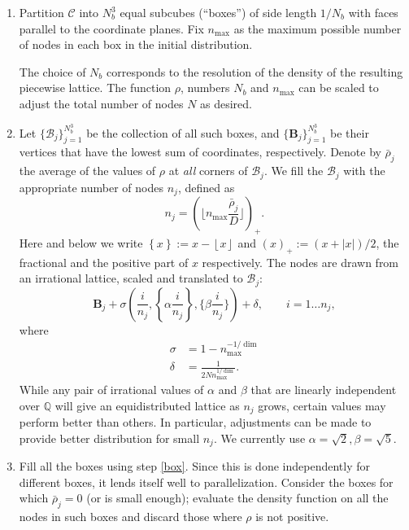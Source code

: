 \documentclass[10pt]{amsart}
\newcommand{\ndbox}{\mathcal{B}}
\begin{document}
\begin{enumerate}
	
	\item \label{subcubes}  Partition $\mathcal{C}$ into $N_b^3$ equal subcubes (``boxes'') of side length $1/N_b$ with faces parallel to the coordinate planes. Fix $n_\text{max}$ as the maximum possible number of nodes in each box in the initial distribution. 
	
	The choice of $N_b$ corresponds to the resolution of the density of the resulting piecewise lattice. The function $ \rho $, numbers $N_b$  and $n_\text{max}$ can be scaled to adjust the total number of nodes $N$ as desired. 
	
	\item \label{box}  Let  $\{\ndbox_j\}_{j=1}^{N_b^3}$ be the collection of all such boxes, and $\{\boldsymbol{B}_j\}_{j=1}^{N_b^3}$ be their vertices that have the lowest sum of coordinates, respectively. Denote by $\bar{\rho}_j$ the average of the values of $\rho$ at \textit{all} corners of $\ndbox_j$. We fill the $ \mathcal{B}_j $ with the appropriate number of nodes $ n_j $, defined as 
	\[  n_j = \left(\lfloor  n_\text{max} \frac{ \bar{\rho}_j}{D} \rfloor \right)_+.  \] 
	Here and below we write $\left\{x\right\}:= x-\left\lfloor x\right\rfloor$   and $ \left(x\right)_+:=(x+|x|)/2 $, the fractional and the positive part of $ x $ respectively. The nodes are drawn from an irrational lattice,  scaled and translated to $\ndbox_j$:
	\[ \boldsymbol{B}_j + \sigma \left(\frac{i}{n_j}, \left\{\alpha\frac{i}{n_j}\right\}, \bigg\{\beta\frac{i}{n_j}\bigg\}\right) + \delta, \qquad i=1\dots n_j, \]
	where 
	\[ \begin{aligned}
	 \sigma&={ 1 - n_\text{max}^{-1/\dim} }\\
	 \delta&=\frac{1}{2Nn_\text{max}^{1/\dim}}. 
	\end{aligned}\]
	 While any pair of irrational values of $\alpha$ and $\beta$ that are linearly independent over $ \mathbb{Q} $ will give an equidistributed lattice as $n_j$ grows, certain values  may perform better than others. In particular, adjustments can be made to provide better distribution for small $n_j$. We currently use $\alpha = \sqrt{2}, \beta = \sqrt{5}$.
	
	\item \label{fill_boxes} Fill all the boxes using step \eqref{box}. Since this is done independently for different boxes, it lends itself well to parallelization. Consider the boxes for which $ \bar{\rho}_j =0 $ (or is small enough); evaluate the density function on all the nodes in such boxes and discard those where $ \rho $ is not positive.
	

\end{enumerate}
\end{document}

